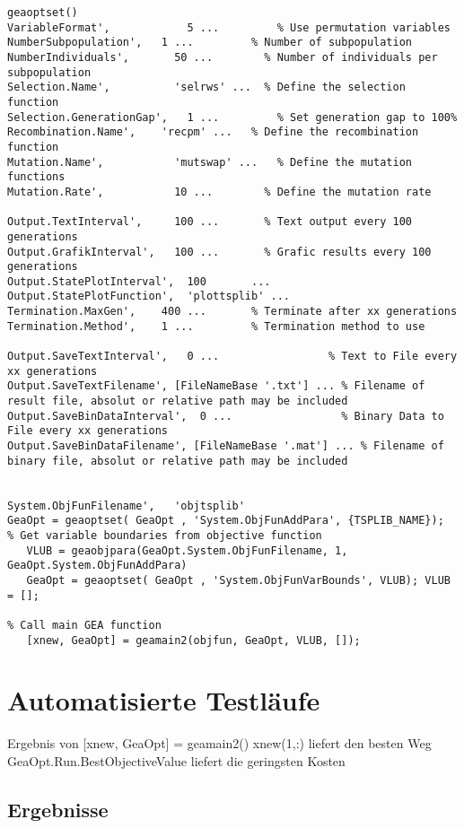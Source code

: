 \begin{lstlisting}
geaoptset()
VariableFormat',            5 ...         % Use permutation variables  
NumberSubpopulation',   1 ...         % Number of subpopulation
NumberIndividuals',       50 ...        % Number of individuals per subpopulation
Selection.Name',          'selrws' ...  % Define the selection function
Selection.GenerationGap',   1 ...         % Set generation gap to 100%   
Recombination.Name',    'recpm' ...   % Define the recombination function
Mutation.Name',           'mutswap' ...   % Define the mutation functions
Mutation.Rate',           10 ...        % Define the mutation rate                   

Output.TextInterval',     100 ...       % Text output every 100 generations
Output.GrafikInterval',   100 ...       % Grafic results every 100 generations
Output.StatePlotInterval',  100       ...
Output.StatePlotFunction',  'plottsplib' ...
Termination.MaxGen',    400 ...       % Terminate after xx generations
Termination.Method',    1 ...         % Termination method to use

Output.SaveTextInterval',   0 ...                 % Text to File every xx generations
Output.SaveTextFilename', [FileNameBase '.txt'] ... % Filename of result file, absolut or relative path may be included
Output.SaveBinDataInterval',  0 ...                 % Binary Data to File every xx generations
Output.SaveBinDataFilename', [FileNameBase '.mat'] ... % Filename of binary file, absolut or relative path may be included


System.ObjFunFilename',   'objtsplib'
GeaOpt = geaoptset( GeaOpt , 'System.ObjFunAddPara', {TSPLIB_NAME});
% Get variable boundaries from objective function
   VLUB = geaobjpara(GeaOpt.System.ObjFunFilename, 1, GeaOpt.System.ObjFunAddPara)
   GeaOpt = geaoptset( GeaOpt , 'System.ObjFunVarBounds', VLUB); VLUB = [];

% Call main GEA function
   [xnew, GeaOpt] = geamain2(objfun, GeaOpt, VLUB, []);
\end{lstlisting}


\section{Automatisierte Testläufe}

Ergebnis von [xnew, GeaOpt] = geamain2()
xnew(1,:) liefert den besten Weg
GeaOpt.Run.BestObjectiveValue liefert die geringsten Kosten

\subsection{Ergebnisse}


